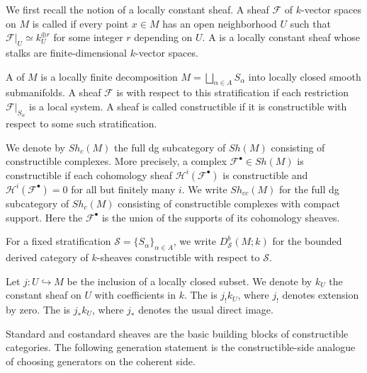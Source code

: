{We first recall the notion of a locally constant sheaf.  A sheaf
\(\mathcal F\) of \(k\)-vector spaces on \(M\) is called
 if every point \(x\in M\) has an open
neighborhood \(U\) such that \(\mathcal F|_U\simeq k_U^{\oplus r}\) for
some integer \(r\) depending on \(U\).  A  is a
locally constant sheaf whose stalks are finite-dimensional
\(k\)-vector spaces.

A  of \(M\) is a locally finite decomposition
\(M=\bigsqcup_{\alpha\in A}S_\alpha\) into locally closed smooth
submanifolds.  A sheaf \(\mathcal F\) is  with
respect to this stratification if each restriction
\(\mathcal F|_{S_\alpha}\) is a local system.  A sheaf is called
constructible if it is constructible with respect to some such
stratification.

We denote by \(Sh_c(M)\) the full dg subcategory of \(Sh(M)\) consisting
of constructible complexes.  More precisely, a complex
\(\mathcal F^\bullet\in Sh(M)\) is constructible if each cohomology
sheaf \(\mathcal H^i(\mathcal F^\bullet)\) is constructible and
\(\mathcal H^i(\mathcal F^\bullet)=0\) for all but finitely many
\(i\).  We write \(Sh_{cc}(M)\) for the full dg subcategory of
\(Sh_c(M)\) consisting of constructible complexes with compact support.
Here the  \(\mathcal F^\bullet\) is the
union of the supports of its cohomology sheaves.

For a fixed stratification \(\mathcal S=\{S_\alpha\}_{\alpha\in A}\), we
write \(D^b_{\mathcal S}(M;k)\) for the bounded derived category of
\(k\)-sheaves constructible with respect to \(\mathcal S\).




Let \(j:U\hookrightarrow M\) be the inclusion of a locally closed subset.
We denote by \(k_U\) the constant sheaf on \(U\) with coefficients in
\(k\).  The  is \(j_!k_U\),
where \(j_!\) denotes extension by zero.  The  is \(j_*k_U\), where \(j_*\) denotes the usual
direct image.

Standard and costandard sheaves are the basic building blocks of
constructible categories.  The following generation statement is the
constructible-side analogue of choosing generators on the coherent side.


}
